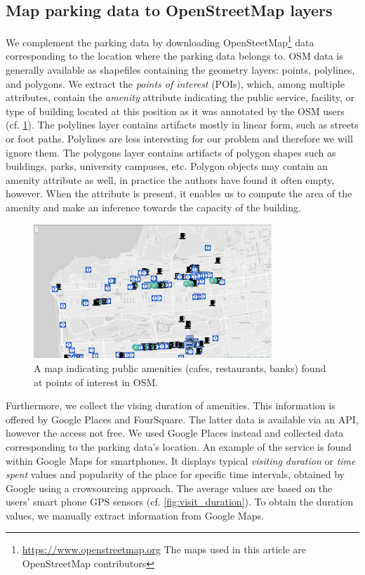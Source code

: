 \documentclass{ws-ijait}
\begin{document}
		\subsection{Map parking data to OpenStreetMap layers}
		We complement the parking data by downloading OpenSteetMap\footnote{\url{https://www.openstreetmap.org} The maps used in this article are \textcopyright OpenStreetMap contributors} data corresponding to the location where the parking data belongs to. OSM data is generally available as shapefiles containing the geometry layers: points, polylines, and polygons. We extract the \textit{points of interest} (POIs), which, among multiple attributes, contain the \textit{amenity} attribute indicating the public service, facility, or type of building located at this position as it was annotated by the OSM users (cf. \cref{fig:pois}). The polylines layer contains artifacts mostly in linear form, such as streets or foot paths. Polylines are less interesting for our problem and therefore we will ignore them. The polygons layer contains artifacts of polygon shapes such as buildings, parks, university campuses, etc. Polygon objects may contain an amenity attribute as well, in practice the authors have found it often empty, however. When the attribute is present, it enables us to compute the area of the amenity and make an inference towards the capacity of the building.
		
		\begin{figure}[!ht]
			\centering
			\includegraphics[width=0.8\textwidth]{../graphics/cafes_restaurants_banks_larger.png}
			\caption{A map indicating public amenities (cafes, restaurants, banks) found at points of interest in OSM.}
			\label{fig:pois}
		\end{figure}
		
		Furthermore, we collect the vising duration of amenities. This information is offered by Google Places and FourSquare. The latter data is available via an API, however the access not free. We used Google Places instead and collected data corresponding to the parking data's location. An example of the service is found within Google Maps for smartphones. It displays typical \textit{visiting duration} or \textit{time spent} values and popularity of the place for specific time intervals, obtained by Google using a crowsourcing approach. The average values are based on the users' smart phone GPS sensors (cf. \cref{fig:visit_duration}). To obtain the duration values, we manually extract information from Google Maps.
		
\end{document}
